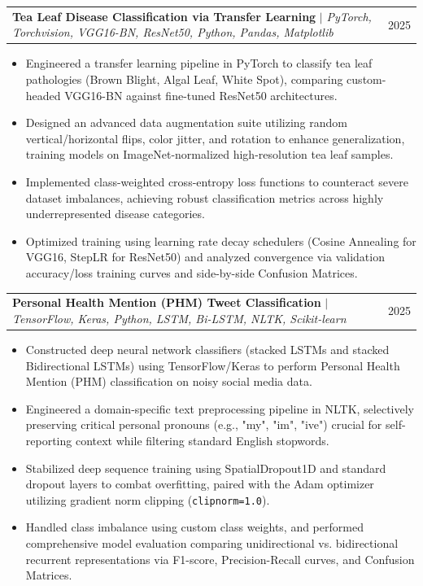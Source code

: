 \documentclass[letterpaper,11pt]{article}
\makeatletter
\newcommand{\resumeItem}[1]{
  \item\small{
    {#1 \vspace{-2pt}}
  }
}
\newcommand{\resumeProjectHeading}[2]{
    \item
    \begin{tabular*}{0.97\textwidth}{l@{\extracolsep{\fill}}r}
      \small#1 & #2 \\
    \end{tabular*}\vspace{-7pt}
}
\newcommand{\resumeItemListStart}{\begin{itemize}}
\newcommand{\resumeItemListEnd}{\end{itemize}\vspace{-5pt}}
\makeatother
\begin{document}
      \resumeProjectHeading
          {\textbf{Tea Leaf Disease Classification via Transfer Learning} $|$ \emph{PyTorch, Torchvision, VGG16-BN, ResNet50, Python, Pandas, Matplotlib}}{2025}
          \resumeItemListStart
            \resumeItem{Engineered a transfer learning pipeline in PyTorch to classify tea leaf pathologies (Brown Blight, Algal Leaf, White Spot), comparing custom-headed VGG16-BN against fine-tuned ResNet50 architectures.}
            \resumeItem{Designed an advanced data augmentation suite utilizing random vertical/horizontal flips, color jitter, and rotation to enhance generalization, training models on ImageNet-normalized high-resolution tea leaf samples.}
            \resumeItem{Implemented class-weighted cross-entropy loss functions to counteract severe dataset imbalances, achieving robust classification metrics across highly underrepresented disease categories.}
            \resumeItem{Optimized training using learning rate decay schedulers (Cosine Annealing for VGG16, StepLR for ResNet50) and analyzed convergence via validation accuracy/loss training curves and side-by-side Confusion Matrices.}
          \resumeItemListEnd

      \resumeProjectHeading
          {\textbf{Personal Health Mention (PHM) Tweet Classification} $|$ \emph{TensorFlow, Keras, Python, LSTM, Bi-LSTM, NLTK, Scikit-learn}}{2025}
          \resumeItemListStart
            \resumeItem{Constructed deep neural network classifiers (stacked LSTMs and stacked Bidirectional LSTMs) using TensorFlow/Keras to perform Personal Health Mention (PHM) classification on noisy social media data.}
            \resumeItem{Engineered a domain-specific text preprocessing pipeline in NLTK, selectively preserving critical personal pronouns (e.g., "my", "im", "ive") crucial for self-reporting context while filtering standard English stopwords.}
            \resumeItem{Stabilized deep sequence training using SpatialDropout1D and standard dropout layers to combat overfitting, paired with the Adam optimizer utilizing gradient norm clipping (\texttt{clipnorm=1.0}).}
            \resumeItem{Handled class imbalance using custom class weights, and performed comprehensive model evaluation comparing unidirectional vs. bidirectional recurrent representations via F1-score, Precision-Recall curves, and Confusion Matrices.}
          \resumeItemListEnd
\end{document}
